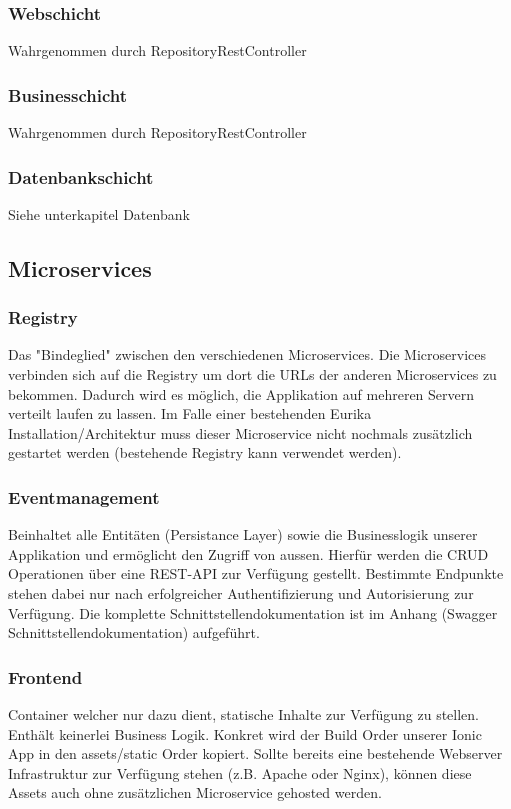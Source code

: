 \documentclass[11pt]{article} %
\begin{document}
\subsubsection{Webschicht}
Wahrgenommen durch RepositoryRestController

\subsubsection{Businesschicht}
Wahrgenommen durch RepositoryRestController

\subsubsection{Datenbankschicht}
Siehe unterkapitel Datenbank

\subsection{Microservices}
\subsubsection{Registry}
	Das "Bindeglied" zwischen den verschiedenen Microservices. Die Microservices verbinden sich auf die Registry um dort die URLs der anderen Microservices zu bekommen. Dadurch wird es möglich, die Applikation auf mehreren Servern verteilt laufen zu lassen. Im Falle einer bestehenden Eurika Installation/Architektur muss dieser Microservice nicht nochmals zusätzlich gestartet werden (bestehende Registry kann verwendet werden).

\subsubsection{Eventmanagement}
	Beinhaltet alle Entitäten (Persistance Layer) sowie die Businesslogik unserer Applikation und ermöglicht den Zugriff von aussen. Hierfür werden die CRUD Operationen über eine REST-API zur Verfügung gestellt. Bestimmte Endpunkte stehen dabei nur nach erfolgreicher Authentifizierung und Autorisierung zur Verfügung. Die komplette Schnittstellendokumentation ist im Anhang (Swagger Schnittstellendokumentation) aufgeführt.

\subsubsection{Frontend}
	Container welcher nur dazu dient, statische Inhalte zur Verfügung zu stellen. Enthält keinerlei Business Logik. Konkret wird der Build Order unserer Ionic App in den assets/static Order kopiert. Sollte bereits eine bestehende Webserver Infrastruktur zur Verfügung stehen (z.B. Apache oder Nginx), können diese Assets auch ohne zusätzlichen Microservice gehosted werden.
\end{document}
